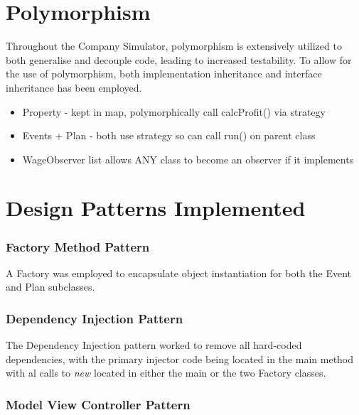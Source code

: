 \documentclass[]{article}
\begin{document}

\vspace*{0.8cm}
\section*{Polymorphism}

Throughout the Company Simulator, polymorphism is extensively utilized to both generalise and decouple code, leading to increased testability. To allow for the use of polymorphism, both implementation inheritance and interface inheritance has been employed.

\begin{itemize}
	\item Property - kept in map, polymorphically call calcProfit() via strategy
	\item Events + Plan - both use strategy so can call run() on parent class
	\item WageObserver list allows ANY class to become an observer if it implements
\end{itemize}


\section*{Design Patterns Implemented}

\subsubsection*{Factory Method Pattern}

A Factory was employed to encapsulate object instantiation for both the Event and Plan subclasses.

\subsubsection*{Dependency Injection Pattern}

The Dependency Injection pattern worked to remove all hard-coded dependencies, with the primary injector code being located in the main method with al calls to \textit{new} located in either the main or the two Factory classes.

\subsubsection*{Model View Controller Pattern}
\end{document}
